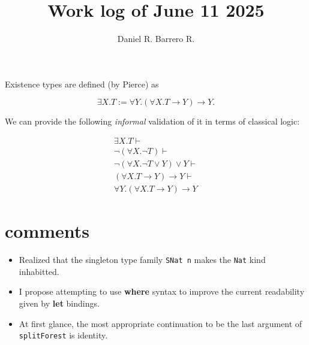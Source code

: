 \documentclass{amsart}
\title{Work log of June 11 2025}
\author{Daniel R. Barrero R.}
\begin{document}
\maketitle

Existence types are defined (by Pierce) as  

$$
\exists X . T := \forall Y . (\forall X . T \to Y) \to Y.
$$

We can provide the following \emph{informal} validation of it in
terms of classical logic:

\begin{eqnarray*}
	\exists X . T \vdash \\
	\neg (\forall X . \neg T) \vdash \\
	\neg (\forall X . \neg T \lor Y) \lor Y \vdash \\
	(\forall X . T \to Y) \to Y \vdash \\
	\forall Y . (\forall X . T \to Y) \to Y
\end{eqnarray*}

\section{comments}

\begin{itemize}
	\item Realized that the singleton type family \texttt{SNat n} makes the
		\texttt{Nat} kind inhabitted.
	\item I propose attempting to use \textbf{where} syntax to improve the
		current readability given by \textbf{let} bindings.
	\item At first glance, the most appropriate continuation to be the last
		argument of \texttt{splitForest} is identity.
\end{itemize}
\end{document}
